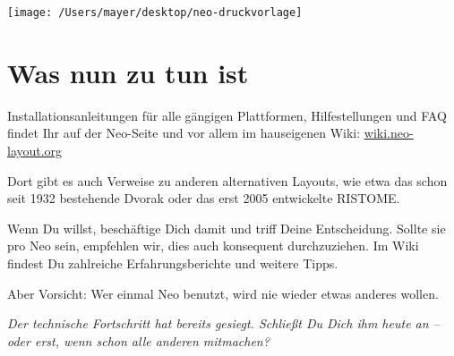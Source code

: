 \documentclass[%
  a4paper
  ,ngerman
  ,notumble
]{leaflet}
\begin{document}
\vfill

\hspace*{2ex}
\texttt{[image: /Users/mayer/desktop/neo-druckvorlage]}

\section{Was nun zu tun ist}
Installationsanleitungen für alle gängigen Plattformen, Hilfestellungen und FAQ findet Ihr auf der Neo-Seite und vor allem im hauseigenen Wiki: \url{wiki.neo-layout.org} 

Dort gibt es auch Verweise zu anderen alternativen Layouts, wie etwa das schon seit 1932 bestehende Dvorak oder das erst 2005 entwickelte RISTOME. 

Wenn Du willst, beschäftige Dich damit und triff Deine Entscheidung. Sollte sie pro Neo sein, empfehlen wir, dies auch konsequent durchzuziehen. Im Wiki findest Du zahlreiche Erfahrungsberichte und weitere Tipps.

Aber Vorsicht: Wer einmal Neo benutzt, wird nie wieder etwas anderes wollen.

\vspace{12.5em}
\emph{Der technische Fortschritt hat bereits gesiegt. Schließt Du Dich ihm heute an – oder erst, wenn schon alle anderen mitmachen?}

\newpage

\blindtext[6]
\end{document}
